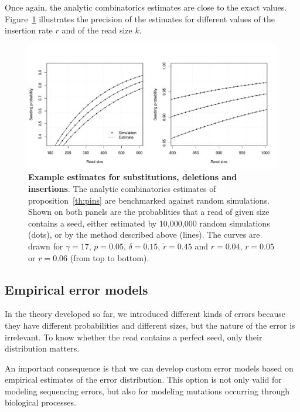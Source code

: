 \documentclass{article}
\begin{document}
Once again, the analytic combinatorics estimates are close to the exact
values. Figure~\ref{fig:simulpins} illustrates the precision of the
estimates for different values of the insertion rate $r$ and of the read
size $k$.

\begin{figure}[h]
\centering
\includegraphics[scale=0.445]{simulpins.pdf}
\caption{\textbf{Example estimates for substitutions, deletions and
insertions}. The analytic combinatorics estimates of
proposition~\ref{th:pins} are benchmarked against random simulations.
Shown on both panels are the probablities that a read of given size
contains a seed, either estimated by 10,000,000 random simulations (dots),
or by the method described above (lines). The curves are drawn for
$\gamma=17$, $p=0.05$, $\delta=0.15$, $\tilde{r} = 0.45$ and $r=0.04$,
$r=0.05$ or $r=0.06$ (from top to bottom).}
\label{fig:simulpins}
\end{figure}





\subsection{Empirical error models}
\label{subsec:empirical}

In the theory developed so far, we introduced different kinds of errors
because they have different probabilities and different sizes, but the
nature of the error is irrelevant. To know whether the read contains a
perfect seed, only their distribution matters.

An important consequence is that we can develop custom error models based
on empirical estimates of the error distribution. This option is not only
valid for modeling sequencing errors, but also for modeling mutations
occurring through biological processes.
\end{document}
